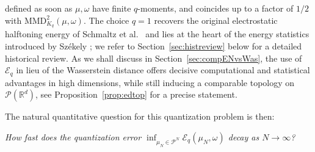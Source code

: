 \documentclass[12pt,a4paper,oneside]{amsart}
\theoremstyle{plain}
\theoremstyle{definition}
\numberwithin{equation}{section}
\numberwithin{figure}{section}
\numberwithin{table}{section}
\theoremstyle{remark}
\newcommand{\R}{\mathbb{R}}
\begin{document}
defined as soon as $\mu,\omega$ have finite $q$-moments, and coincides up to a factor of $1/2$ with $\mathrm{MMD}_{K_q}^2(\mu,\omega)$. The choice $q=1$ recovers the original electrostatic halftoning energy of Schmaltz et al.~\cite{schmaltz2010electrostatic} and lies at the heart of the energy statistics introduced by Sz\'ekely \cite{szekely2007measuring,szekely2013energy,szekely2023energy}; we refer to Section~\ref{sec:histreview} below for a detailed historical review. As we shall discuss in Section~\ref{sec:compENvsWas}, the use of $\mathcal{E}_q$ in lieu of the Wasserstein distance offers decisive computational and statistical advantages in high dimensions, while still inducing a comparable topology on $\mathcal{P}(\R^d)$, see Proposition~\ref{prop:edtop} for a precise statement.

The natural quantitative question for this quantization problem is then:
\medskip

\centerline{\emph{How fast does the quantization error $\inf_{\mu_N\in\mathcal P^N}\mathcal{E}_q(\mu_N,\omega)$ decay as $N\to\infty$?}}
\medskip
\end{document}
